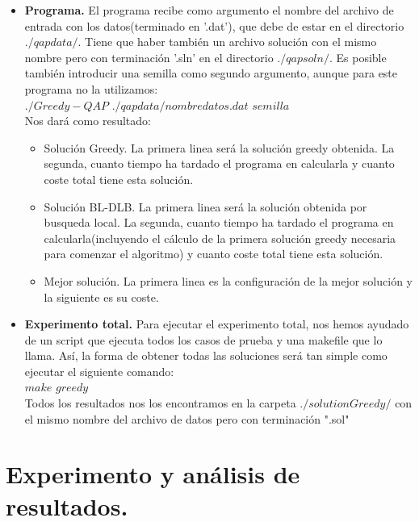 \begin{itemize}
	\item \textbf{Programa.} El programa recibe como argumento el nombre del archivo de entrada con los datos(terminado en '.dat'), que debe de estar en el directorio $./qapdata/$. Tiene que haber también un archivo solución con el mismo nombre pero con terminación '.sln'  en el directorio $./qapsoln/$. Es posible también introducir una semilla como segundo argumento, aunque para este programa no la utilizamos:\\
	
	$./Greedy-QAP$ $./qapdata/nombredatos.dat$ $semilla$\\
	
	Nos dará como resultado:\\
	\begin{itemize}
		\item Solución Greedy. La primera linea será la solución greedy obtenida. La segunda, cuanto tiempo ha tardado el programa en calcularla y cuanto coste total tiene esta solución.
		\item Solución BL-DLB. La primera linea será la solución obtenida por busqueda local. La segunda, cuanto tiempo ha tardado el programa en calcularla(incluyendo el cálculo de la primera solución greedy necesaria para comenzar el algoritmo) y cuanto coste total tiene esta solución.
		\item Mejor solución. La primera linea es la configuración de la mejor solución y la siguiente es su coste.
	\end{itemize}
	
	\item \textbf{Experimento total.} Para ejecutar el experimento total, nos hemos ayudado de un script que ejecuta todos los casos de prueba y una makefile que lo llama. Así, la forma de obtener todas las soluciones será tan simple como ejecutar el siguiente comando:\\
	
	$make$ $greedy$\\
	
	Todos los resultados nos los encontramos en la carpeta $./solutionGreedy/$ con el mismo nombre del archivo de datos pero con terminación ".sol"
\end{itemize}

\newpage
\section{Experimento y análisis de resultados.}

